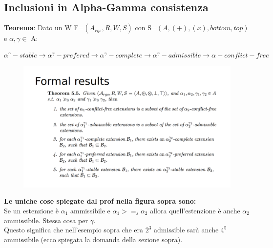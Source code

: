 \subsection{Inclusioni in Alpha-Gamma consistenza}
\textbf{Teorema}: Dato un W F=$(A_{rgs }, R, W, S)$ con S=$(A, (+), (x), bottom, top)$ e $\alpha, \gamma \in$ A:
\begin{center}
    $\alpha^\gamma-stable \rightarrow \alpha^\gamma-prefered \rightarrow \alpha^\gamma-complete \rightarrow \alpha^\gamma-admissible \rightarrow \alpha-conflict-free$
\end{center}
\begin{figure}[htp]
	\centering
    \includegraphics[width=15cm, keepaspectratio]{latex/img/Cap6/alpha-gamma2.png}
\end{figure}
\textbf{Le uniche cose spiegate dal prof nella figura sopra sono:}
\\Se un estenzione è $ \alpha_1$ ammissibile e $\alpha_1 >=_s \alpha_2$ allora quell’estenzione è anche $\alpha_2$ ammissibile. Stessa cosa per $\gamma$.
\\Questo significa che nell’esempio sopra che era $2^3$ admissible sarà anche $4^5$ ammissibile (ecco spiegata la domanda della sezione sopra).

